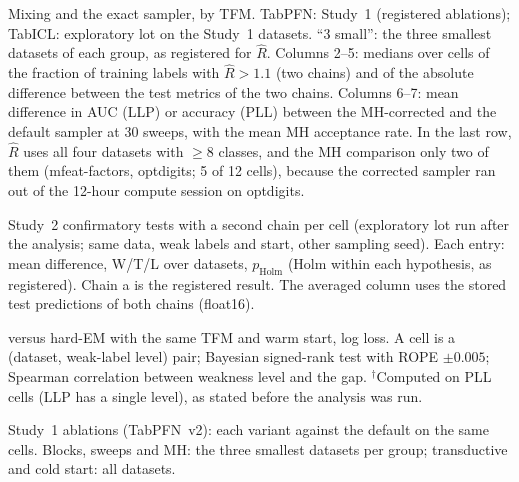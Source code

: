 \begin{table}[!htbp]
\centering
\caption{Mixing and the exact sampler, by TFM. TabPFN: Study~1 (registered ablations); TabICL: exploratory lot on the
Study~1 datasets. ``3 small'': the three smallest datasets of each group, as registered for $\widehat R$. Columns 2--5:
medians over cells of the fraction of training labels with $\widehat R>1.1$ (two chains) and of the absolute difference
between the test metrics of the two chains. Columns 6--7: mean difference in AUC (LLP) or accuracy (PLL) between the
MH-corrected and the default sampler at 30 sweeps, with the mean MH acceptance rate. In the last row, $\widehat R$ uses all
four datasets with $\geq$8 classes, and the MH comparison only two of them (mfeat-factors, optdigits; 5 of 12 cells),
because the corrected sampler ran out of the 12-hour compute session on optdigits.}
\label{tab:s2e}
\small
\resizebox{\textwidth}{!}{}
\end{table}

\begin{table}[!htbp]
\centering
\caption{Study~2 confirmatory tests with a second chain per cell (exploratory lot run after the analysis; same data,
weak labels and start, other sampling seed). Each entry: mean difference, W/T/L over datasets, $p_{\mathrm{Holm}}$
(Holm within each hypothesis, as registered). Chain a is the registered result. The averaged column uses the stored
test predictions of both chains (float16).}
\label{tab:r4}
\small
\resizebox{\textwidth}{!}{}
\end{table}

\begin{table}[!htbp]
\centering
\caption{\ours{} versus hard-EM with the same TFM and warm start, log loss. A cell is a (dataset, weak-label level)
pair; Bayesian signed-rank test with ROPE $\pm0.005$; Spearman correlation between weakness level and the gap.
$^\dagger$Computed on PLL cells (LLP has a single level), as stated before the analysis was run.}
\label{tab:h3}
\small

\end{table}

\begin{table}[!htbp]
\centering
\caption{Study~1 ablations (TabPFN~v2): each variant against the default on the same cells. Blocks, sweeps and MH: the
three smallest datasets per group; transductive and cold start: all datasets.}
\label{tab:ablation}
\small

\end{table}

